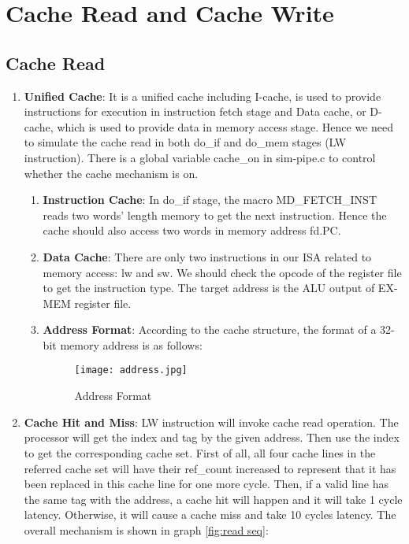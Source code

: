 \documentclass[paper=a4, fontsize=11pt]{scrartcl} %
\numberwithin{equation}{section} %
\numberwithin{figure}{section} %
\numberwithin{table}{section} %
\begin{document}
\section{Cache Read and Cache Write}

\subsection{Cache Read}

\begin{enumerate}
\item \textbf{Unified Cache}: It is a unified cache including I-cache, is used to provide instructions for execution in instruction fetch stage and Data cache, or D-cache, which is used to provide data in memory access stage. Hence we need to simulate the cache read in both do\_if and do\_mem stages (LW instruction). There is a global variable cache\_on in sim-pipe.c to control whether the cache mechanism is on.
    \begin{enumerate}
    \item \textbf{Instruction Cache}: In do\_if stage, the macro MD\_FETCH\_INST reads two words' length memory to get the next instruction. Hence the cache should also access two words in memory address fd.PC.
    \item \textbf{Data Cache}: There are only two instructions in our ISA related to memory access: lw and sw. We should check the opcode of the register file to get the instruction type. The target address is the ALU output of EX-MEM register file.
    \item \textbf{Address Format}: According to the cache structure, the format of a 32-bit memory address is as follows:
    \begin{figure}[!ht]
    \centering
    \texttt{[image: address.jpg]}
    \caption{Address Format}
    \end{figure}
    \end{enumerate}
\item \textbf{Cache Hit and Miss}: LW instruction will invoke cache read operation. The processor will get the index and tag by the given address. Then use the index to get the corresponding cache set. First of all, all four cache lines in the referred cache set will have their ref\_count increased to represent that it has been replaced in this cache line for one more cycle. Then, if a valid line has the same tag with the address, a cache hit will happen and it will take 1 cycle latency. Otherwise, it will cause a cache miss and take 10 cycles latency. The overall mechanism is shown in graph \ref{fig:read seq}:

\end{enumerate}
\end{document}
